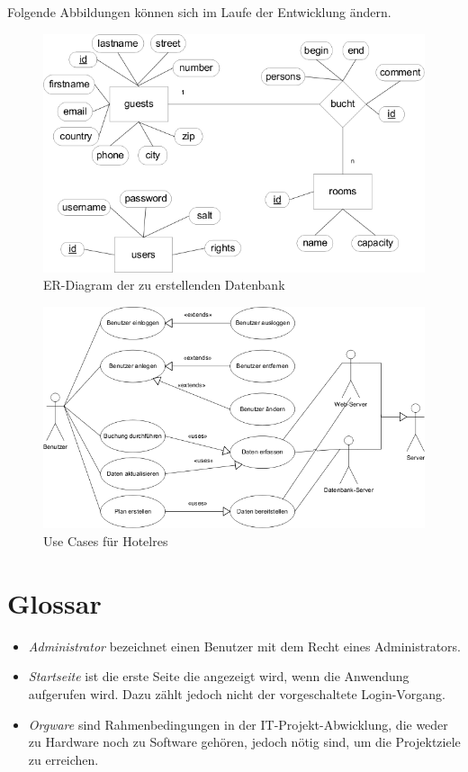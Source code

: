\documentclass[a4paper,oneside]{scrreprt}
\begin{document}
Folgende Abbildungen können sich im Laufe der Entwicklung ändern.

\hspace{2.5 cm} %

\begin{figure}[h]
\centering
\includegraphics[width=\textwidth]{er-chart.png}
\caption{ER-Diagram der zu erstellenden Datenbank}
\label{entity-relationship}
\end{figure}

\begin{figure}[h]
\centering
\includegraphics[width=\textwidth]{use-cases.png}
\caption{Use Cases für Hotelres}
\label{use-cases}
\end{figure}



\chapter{Glossar}

\begin{itemize}
\item \emph{Administrator} bezeichnet einen Benutzer mit dem Recht eines Administrators.

\item \emph{Startseite} ist die erste Seite die angezeigt wird, wenn die Anwendung aufgerufen wird. Dazu zählt jedoch nicht der vorgeschaltete Login-Vorgang.

\item \emph{Orgware} sind Rahmenbedingungen in der IT-Projekt-Abwicklung, die weder zu Hardware noch zu Software gehören, jedoch nötig sind, um die Projektziele zu erreichen.
\end{itemize}
\end{document}
